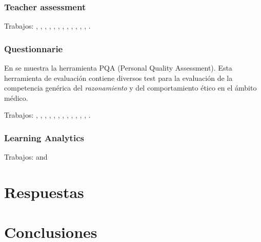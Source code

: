 \subsubsection{Teacher assessment}

Trabajos: \cite{yang2014fine}, \cite{martin2013acquired}, \cite{barbera2011assessment}, \cite{martin2010new}, \cite{prashar2010competence}, \cite{serrano2013hiperion}, \cite{casan2015developing}, \cite{guenaga2013serious}, \cite{bedek2011behavioral}, \cite{ward2011developing}, \cite{rodriguez2010portfolio}, \cite{lacuesta2009active}, \cite{benlloch2007adapting}.

\subsubsection{Questionnarie}

En \cite{lumsden2005assessment} se muestra la herramienta PQA (Personal Quality Assessment). Esta herramienta de evaluación contiene diversos test para la evaluación de la competencia genérica del \emph{razonamiento} y del {comportamiento ético} en el ámbito médico.

Trabajos: \cite{vizcarro2013assessment}, \cite{ruizacarate2013soft}, \cite{barbera2011design}, \cite{so2011mapping}, \cite{badcock2010developing}, \cite{aziz2007appraisal}, \cite{rashid2008engineering}, \cite{a2007outcome}, \cite{albergaria2011critical}, \cite{park2006moral}, \cite{andre2011formal}, \cite{martinez2014teamwork}, \cite{fernandez2011experience}.

\subsubsection{Learning Analytics}

Trabajos: \cite{fidalgo:2015} and \cite{rayon2014web}

\section{Respuestas}



\section{Conclusiones}









